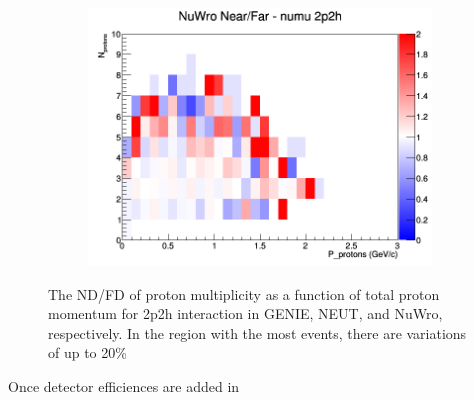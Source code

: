 \documentclass[12pt]{article}
\begin{document}
\begin{figure}[h]
\begin{subfigure}[b]{0.32\textwidth}
\includegraphics[width=\linewidth]{N_P/nominal/protons/ratios/2p2h_NuWro_numu_NF_N_P.png}
\end{subfigure}
\caption{The ND/FD of proton multiplicity as a function of total proton momentum for 2p2h interaction in GENIE, NEUT, and NuWro, respectively. In the region with the most events, there are variations of up to 20\%}
\label{fig:proton_multiplicity_2p2h_NF}
\end{figure}

Once detector efficiences are added in
\end{document}
